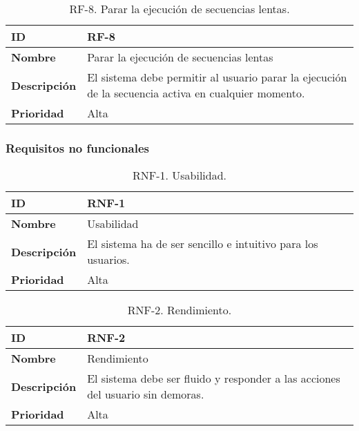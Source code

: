 \begin{table}[h!]
    \centering
    \begin{tabular}{|m{2.5cm}|m{9.27cm}|}
        \hline
        \textbf{ID} & RF-8 \\
        \hline
        \textbf{Nombre} & Parar la ejecución de secuencias lentas \\
        \hline
        \textbf{Descripción} & El sistema debe permitir al usuario parar la ejecución de la secuencia activa en cualquier momento. \\
        \hline
        \textbf{Prioridad} & Alta \\
        \hline
    \end{tabular}
    \caption{RF-8. Parar la ejecución de secuencias lentas.}
\end{table}

\FloatBarrier

\subsubsection{Requisitos no funcionales}

\begin{table}[h!]
    \centering
    \begin{tabular}{|m{2.5cm}|m{9.27cm}|}
        \hline
        \textbf{ID} & RNF-1 \\
        \hline
        \textbf{Nombre} & Usabilidad \\
        \hline
        \textbf{Descripción} & El sistema ha de ser sencillo e intuitivo para los usuarios. \\
        \hline
        \textbf{Prioridad} & Alta \\
        \hline
    \end{tabular}
    \caption{RNF-1. Usabilidad.}
\end{table}

\begin{table}[h!]
    \centering
    \begin{tabular}{|m{2.5cm}|m{9.27cm}|}
        \hline
        \textbf{ID} & RNF-2 \\
        \hline
        \textbf{Nombre} & Rendimiento \\
        \hline
        \textbf{Descripción} & El sistema debe ser fluido y responder a las acciones del usuario sin demoras. \\
        \hline
        \textbf{Prioridad} & Alta \\
        \hline
    \end{tabular}
    \caption{RNF-2. Rendimiento.}
\end{table}

